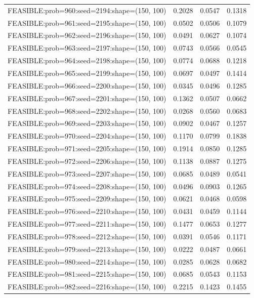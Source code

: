 \begin{longtable}{lccc}
FEASIBLE:prob=960:seed=2194:shape=(150, 100) & 0.2028 & 0.0547 & 0.1318 \\
FEASIBLE:prob=961:seed=2195:shape=(150, 100) & 0.0502 & 0.0506 & 0.1079 \\
FEASIBLE:prob=962:seed=2196:shape=(150, 100) & 0.0491 & 0.0627 & 0.1074 \\
FEASIBLE:prob=963:seed=2197:shape=(150, 100) & 0.0743 & 0.0566 & 0.0545 \\
FEASIBLE:prob=964:seed=2198:shape=(150, 100) & 0.0774 & 0.0688 & 0.1218 \\
FEASIBLE:prob=965:seed=2199:shape=(150, 100) & 0.0697 & 0.0497 & 0.1414 \\
FEASIBLE:prob=966:seed=2200:shape=(150, 100) & 0.0345 & 0.0496 & 0.1285 \\
FEASIBLE:prob=967:seed=2201:shape=(150, 100) & 0.1362 & 0.0507 & 0.0662 \\
FEASIBLE:prob=968:seed=2202:shape=(150, 100) & 0.0268 & 0.0560 & 0.0683 \\
FEASIBLE:prob=969:seed=2203:shape=(150, 100) & 0.0902 & 0.0467 & 0.1257 \\
FEASIBLE:prob=970:seed=2204:shape=(150, 100) & 0.1170 & 0.0799 & 0.1838 \\
FEASIBLE:prob=971:seed=2205:shape=(150, 100) & 0.1914 & 0.0850 & 0.1285 \\
FEASIBLE:prob=972:seed=2206:shape=(150, 100) & 0.1138 & 0.0887 & 0.1275 \\
FEASIBLE:prob=973:seed=2207:shape=(150, 100) & 0.0685 & 0.0489 & 0.0541 \\
FEASIBLE:prob=974:seed=2208:shape=(150, 100) & 0.0496 & 0.0903 & 0.1265 \\
FEASIBLE:prob=975:seed=2209:shape=(150, 100) & 0.0621 & 0.0468 & 0.0598 \\
FEASIBLE:prob=976:seed=2210:shape=(150, 100) & 0.0431 & 0.0459 & 0.1144 \\
FEASIBLE:prob=977:seed=2211:shape=(150, 100) & 0.1477 & 0.0653 & 0.1277 \\
FEASIBLE:prob=978:seed=2212:shape=(150, 100) & 0.0391 & 0.0546 & 0.1171 \\
FEASIBLE:prob=979:seed=2213:shape=(150, 100) & 0.0222 & 0.0487 & 0.0661 \\
FEASIBLE:prob=980:seed=2214:shape=(150, 100) & 0.0285 & 0.0628 & 0.0682 \\
FEASIBLE:prob=981:seed=2215:shape=(150, 100) & 0.0685 & 0.0543 & 0.1153 \\
FEASIBLE:prob=982:seed=2216:shape=(150, 100) & 0.2215 & 0.1423 & 0.1455 \\

\end{longtable}
